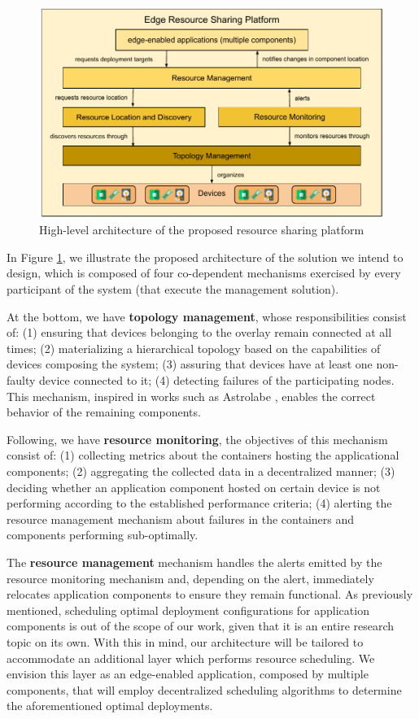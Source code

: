 \begin{figure}
    \centering
    \includegraphics[width=0.9\linewidth]{Figures/proposed_architecture_detailed.pdf}
    \caption{High-level architecture of the proposed resource sharing platform}
    \label{fig:proposed_architecture_detailed}
\end{figure}

In Figure \ref{fig:proposed_architecture_detailed}, we illustrate the proposed architecture of the solution we intend to design, which is composed of four co-dependent mechanisms exercised by every participant of the system (that execute the management solution).

At the bottom, we have \textbf{topology management}, whose responsibilities consist of: (1) ensuring that devices belonging to the overlay remain connected at all times; (2) materializing a hierarchical topology based on the capabilities of devices composing the system; (3) assuring that devices have at least one non-faulty device connected to it; (4) detecting failures of the participating nodes. This mechanism, inspired in works such as Astrolabe \cite{Renesse2003}, enables the correct behavior of the remaining components.

Following, we have \textbf{resource monitoring}, the objectives of this mechanism consist of: (1) collecting metrics about the containers hosting the applicational components; (2) aggregating the collected data in a decentralized manner; (3) deciding whether an application component hosted on certain device is not performing according to the established performance criteria; (4) alerting the resource management mechanism about failures in the containers and components performing sub-optimally.

The \textbf{resource management} mechanism handles the alerts emitted by the resource monitoring mechanism and, depending on the alert, immediately relocates application components to ensure they remain functional. As previously mentioned, scheduling optimal deployment configurations for application components is out of the scope of our work, given that it is an entire research topic on its own. With this in mind, our architecture will be tailored to accommodate an additional layer which performs resource scheduling. We envision this layer as an edge-enabled application, composed by multiple components, that will employ decentralized scheduling algorithms to determine the aforementioned optimal deployments.

